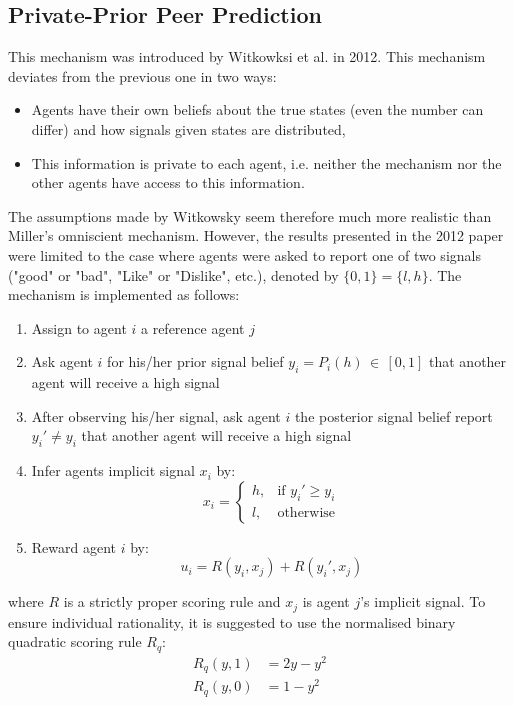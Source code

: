\documentclass{scrartcl}
\begin{document}
\subsection{Private-Prior Peer Prediction}

This mechanism was introduced by Witkowksi et al. in 2012. This mechanism deviates from the previous one in two ways:
\begin{itemize}
\item Agents have their own beliefs about the true states (even the number can differ) and how signals given states are distributed,
\item This information is private to each agent, i.e. neither the mechanism nor the other agents have access to this information.
\end{itemize}

The assumptions made by Witkowsky seem therefore much more realistic than Miller's omniscient mechanism. However, the results presented in the 2012 paper were limited to the case where agents were asked to report one of two signals ("good" or "bad", "Like" or "Dislike", etc.), denoted by $\{0,1\} = \{l,h\}$. The mechanism is implemented as follows:

\begin{enumerate}
\item Assign to agent $i$ a reference agent $j$
\item Ask agent $i$ for his/her prior signal belief $y_i = P_i(h)\,\in\,[0,1]$ that another agent will receive a high signal
\item After observing his/her signal, ask agent $i$ the posterior signal belief report $y_i' \neq y_i$ that another agent will receive a high signal
\item Infer agents implicit signal $x_i$ by:
\[x_i = \begin{cases}
    h,& \text{if } y_i'\geq y_i\\
    l,              & \text{otherwise}
\end{cases}
\]
\item Reward agent $i$ by:
$$u_i = R(y_i,x_j) + R(y_i',x_j)$$
\end{enumerate}
where $R$ is a strictly proper scoring rule and $x_j$ is agent $j$'s implicit signal. To ensure individual rationality, it is suggested to use the normalised binary quadratic scoring rule $R_q$:
\begin{align*}
R_q(y,1) &= 2y-y^2\\
R_q(y,0) &= 1-y^2
\end{align*}
\end{document}
